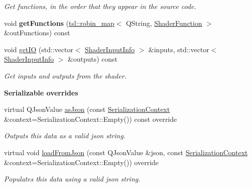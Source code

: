 \begin{Indent}
\begin{DoxyCompactItemize}
\begin{DoxyCompactList}\small\item\em Get functions, in the order that they appear in the source code. \end{DoxyCompactList}\item 
\mbox{\label{classrev_1_1_shader_acd09e1f1eedd1ee467a6d047e35ac9cd}} 
void {\bfseries get\+Functions} (\mbox{\hyperlink{classtsl_1_1robin__map}{tsl\+::robin\+\_\+map}}$<$ Q\+String, \mbox{\hyperlink{structrev_1_1_shader_function}{Shader\+Function}} $>$ \&out\+Functions) const
\item 
\mbox{\label{classrev_1_1_shader_a41963e61ce07f6d8b5468c515e4f7067}} 
void \mbox{\hyperlink{classrev_1_1_shader_a41963e61ce07f6d8b5468c515e4f7067}{get\+IO}} (std\+::vector$<$ \mbox{\hyperlink{structrev_1_1_shader_input_info}{Shader\+Input\+Info}} $>$ \&inputs, std\+::vector$<$ \mbox{\hyperlink{structrev_1_1_shader_input_info}{Shader\+Input\+Info}} $>$ \&outputs) const
\begin{DoxyCompactList}\small\item\em Get inputs and outputs from the shader. \end{DoxyCompactList}\end{DoxyCompactItemize}
\end{Indent}
\begin{Indent}\textbf{ Serializable overrides}\par
\begin{DoxyCompactItemize}
\item 
\mbox{\label{classrev_1_1_shader_ab4a887f38305c0d52548f6fccfa91daa}} 
virtual Q\+Json\+Value \mbox{\hyperlink{classrev_1_1_shader_ab4a887f38305c0d52548f6fccfa91daa}{as\+Json}} (const \mbox{\hyperlink{structrev_1_1_serialization_context}{Serialization\+Context}} \&context=Serialization\+Context\+::\+Empty()) const override
\begin{DoxyCompactList}\small\item\em Outputs this data as a valid json string. \end{DoxyCompactList}\item 
\mbox{\label{classrev_1_1_shader_a7d9a343d864e3f89581faafc431f5355}} 
virtual void \mbox{\hyperlink{classrev_1_1_shader_a7d9a343d864e3f89581faafc431f5355}{load\+From\+Json}} (const Q\+Json\+Value \&json, const \mbox{\hyperlink{structrev_1_1_serialization_context}{Serialization\+Context}} \&context=Serialization\+Context\+::\+Empty()) override
\begin{DoxyCompactList}\small\item\em Populates this data using a valid json string. \end{DoxyCompactList}\end{DoxyCompactItemize}
\end{Indent}
